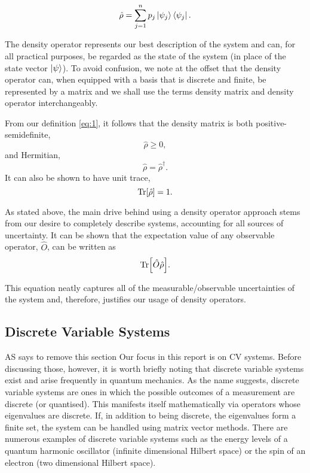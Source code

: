 \documentclass[11pt,a4paper]{article}
\numberwithin{equation}{section}
\begin{document}
	\begin{equation} \label{eq:1}
	\hat{\rho} = \sum_{j=1}^{n} p_j \ket{\psi_j}\bra{\psi_j}.
	\end{equation}
	
	The density operator represents our best description of the system and can, for all practical purposes, be regarded as the state of the system (in place of the state vector $\ket{\psi}$). To avoid confusion, we note at the offset that the density operator can, when equipped with a basis that is discrete and finite, be represented by a matrix and we shall use the terms density matrix and density operator interchangeably.
	
	From our definition \ref{eq:1}, it follows that the density matrix is both positive-semidefinite, 
	\begin{equation} \label{eq:2}
	\hat{\rho} \geq 0,
	\end{equation}
	and Hermitian,
	\begin{equation} \label{eq:3}
	\hat{\rho} = \hat{\rho}^\dagger .
	\end{equation}
	It can also be shown to have unit trace, 
	\begin{equation} \label{eq:4}
	\Tr[\hat{\rho}] = 1.
	\end{equation}
	
	As stated above, the main drive behind using a density operator approach stems from our desire to completely describe systems, accounting for all sources of uncertainty. It can be shown that the expectation value of any observable operator, $\hat{O}$, can be written as
	\begin{equation} \label{eq:5}
	\Tr[\hat{O}\hat{\rho}].
	\end{equation}
	
	This equation neatly captures all of the measurable/observable uncertainties of the system and, therefore, justifies our usage of density operators.
	
	\subsection{Discrete Variable Systems}

	\color{red}AS says to remove this section \color{black}Our focus in this report is on CV systems. Before discussing those, however, it is worth briefly noting that discrete variable systems exist and arise frequently in quantum mechanics. As the name suggests, discrete variable systems are ones in which the possible outcomes of a measurement are discrete (or quantised). This manifests itself mathematically via operators whose eigenvalues are discrete. If, in addition to being discrete, the eigenvalues form a finite set, the system can be handled using matrix vector methods. There are numerous examples of discrete variable systems such as \color{red} the energy levels of a quantum harmonic oscillator (infinite dimensional Hilbert space) or \color{black}the spin of an electron (two dimensional Hilbert space).
	
\end{document}

